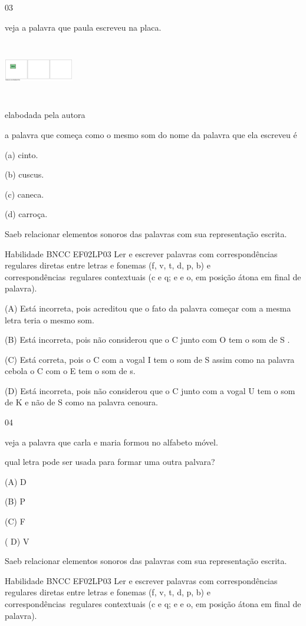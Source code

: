 {{{{{{\num{03}

veja a palavra que paula escreveu na placa.

\includegraphics[width=1.19861in,height=1.00625in]{media/image176.png}

elabodada pela autora

a palavra que começa como o mesmo som do nome da palavra que ela
escreveu é

(a) cinto.

(b) cuscus.

(c) caneca.

(d) carroça.

Saeb relacionar elementos sonoros das palavras com sua representação
escrita.

Habilidade BNCC EF02LP03 Ler e escrever palavras com correspondências
regulares diretas entre letras e fonemas (f, v, t, d, p, b) e
correspondências~regulares contextuais (c e q; e e o, em posição átona
em final de palavra).

(A) Está incorreta, pois acreditou que o fato da palavra começar com a
mesma letra teria o mesmo som.

(B) Está incorreta, pois não considerou que o C junto com O tem o som de
S .

(C) Está correta, pois o C com a vogal I tem o som de S assim como na
palavra cebola o C com o E tem o som de s.

(D) Está incorreta, pois não considerou que o C junto com a vogal U tem
o som de K e não de S como na palavra cenoura.

\num{04}

veja a palavra que carla e maria formou no alfabeto móvel.

qual letra pode ser usada para formar uma outra palvara?

(A) D

(B) P

(C) F

( D) V

Saeb relacionar elementos sonoros das palavras com sua representação
escrita.

Habilidade BNCC EF02LP03 Ler e escrever palavras com correspondências
regulares diretas entre letras e fonemas (f, v, t, d, p, b) e
correspondências~regulares contextuais (c e q; e e o, em posição átona
em final de palavra).

}}}}}}
